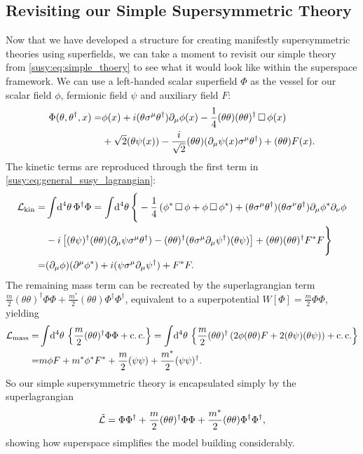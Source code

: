 \documentclass[../main.tex]{subfiles}
\begin{document}
\subsection{Revisiting our Simple Supersymmetric Theory}
Now that we have developed a structure for creating manifestly supersymmetric theories using superfields, we can take a moment to revisit our simple theory from \cref{susy:eq:simple_thoery} to see what it would look like within the superspace framework.
We can use a left-handed scalar superfield \(\Phi\) as the vessel for our scalar field \(\phi\), fermionic field \(\psi\) and auxiliary field \(F\):
\begin{align}
  \nonumber
  \Phi(\theta, \theta^\dagger, x) = & \phi(x) + i(\theta\sigma\^\mu \theta^\dagger) \partial_\mu \phi(x) - \frac{1}{4} (\theta\theta)(\theta\theta)^\dagger \dA \phi(x)      \\
                                    & + \sqrt{2}(\theta \psi(x)) - \frac{i}{\sqrt{2}} (\theta\theta) (\partial_\mu \psi(x) \sigma\^\mu \theta^\dagger) + (\theta\theta)F(x).
\end{align}
The kinetic terms are reproduced through the first term in \cref{susy:eq:general_susy_lagrangian}:
\begin{align}
  \nonumber
  \L_\text{kin} = & \integral{^4\theta} \Phi^\dagger \Phi = \integral{^4\theta} \Bigg\{-\frac{1}{4}\pclosed{\phi^\ast \dA \phi + \phi \dA \phi^\ast} + (\theta \sigma\^\mu \theta^\dagger)(\theta \sigma\^\nu \theta^\dagger) \partial_\mu\phi^\ast \partial_\nu\phi \\
  \nonumber
                  & -i \bclosed{(\theta \psi)^\dagger (\theta\theta) (\partial_\mu \psi \sigma\^\mu \theta^\dagger) - (\theta\theta)^\dagger (\theta \sigma\^\mu \partial_\mu \psi^\dagger) (\theta \psi)} + (\theta\theta)(\theta\theta)^\dagger F^\ast F   \Bigg\} \\
  =               & (\partial_\mu \phi) (\partial^\mu\phi^\ast) + i(\psi \sigma\^\mu \partial_\mu \psi^\dagger) + F^\ast F.
\end{align}
The remaining mass term can be recreated by the superlagrangian term \(\frac{m}{2} (\theta\theta)^\dagger \Phi\Phi + \frac{m^\ast}{2} (\theta\theta) \Phi^\dagger\Phi^\dagger\), equivalent to a superpotential \(W[\Phi] = \frac{m}{2}\Phi \Phi\), yielding
\begin{align}
  \nonumber
  \mathcal{L}_\text{mass} = & \int \!\mathrm{d}^4\theta\, \left\{\frac{m}{2} (\theta\theta)^\dagger \Phi\Phi + \operatorname{c.c.}\right\} = \int \!\mathrm{d}^4\theta\, \left\{\frac{m}{2} (\theta\theta)^\dagger \left(2\phi (\theta\theta) F + 2(\theta\psi)(\theta\psi)\right) + \operatorname{c.c.}\right\} \\
  =                & m \phi F + m^\ast \phi^\ast F^\ast + \frac{m}{2}(\psi\psi) + \frac{m^\ast}{2} (\psi\psi)^\dagger.
\end{align}
So our simple supersymmetric theory is encapsulated simply by the superlagrangian
\begin{equation}
  \tilde{\mathcal{L}} = \Phi \Phi^\dagger + \frac{m}{2} (\theta\theta)^\dagger \Phi\Phi + \frac{m^\ast}{2} (\theta\theta) \Phi^\dagger \Phi^\dagger,
\end{equation}
showing how superspace simplifies the model building considerably.
\end{document}
